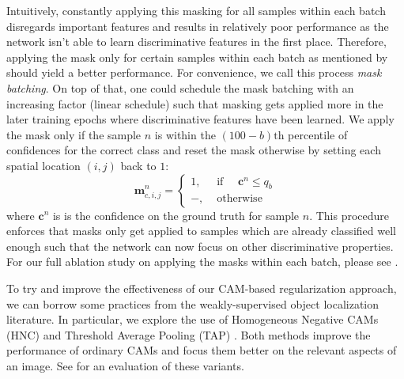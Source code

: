 Intuitively, constantly applying this masking for all samples within each batch disregards important features and results in relatively poor performance as the network isn't able to learn discriminative features in the first place. Therefore, applying the mask only for certain samples within each batch as mentioned by \citet[Secton~3.3]{huang2020selfchallenging} should yield a better performance. For convenience, we call this process \emph{mask batching}. On top of that, one could schedule the mask batching with an increasing factor (\eg linear schedule) such that masking gets applied more in the later training epochs where discriminative features have been learned. We apply the mask only if the sample $n$ is within the $(100-b)\mathrm{th}$ percentile of confidences for the correct class and reset the mask otherwise by setting each spatial location $(i,j)$ back to $1$:
\begin{equation}
    \mathbf{m}^n_{c,i,j}=\left\{\begin{array}{ll}
1, & \text { if } \quad \mathbf{c}^n \leq q_{b} \\
-, & \text { otherwise }
\end{array}\right.
\label{eq:MaskingReversion}
\end{equation}
 where $ \mathbf{c}^n$ is is the confidence on the ground truth for sample $n$. This procedure enforces that masks only get applied to samples which are already classified well enough such that the network can now focus on other discriminative properties. For our full ablation study on applying the masks within each batch, please see .

To try and improve the effectiveness of our CAM-based regularization approach, we can borrow some practices from the weakly-supervised object localization literature. In particular, we explore the use of Homogeneous Negative CAMs (HNC) \citep{sun2020fixing} and Threshold Average Pooling (TAP) \citep{Bae2020RethinkingCAM}. Both methods improve the performance of ordinary CAMs and focus them better on the relevant aspects of an image. See  for an evaluation of these variants.

